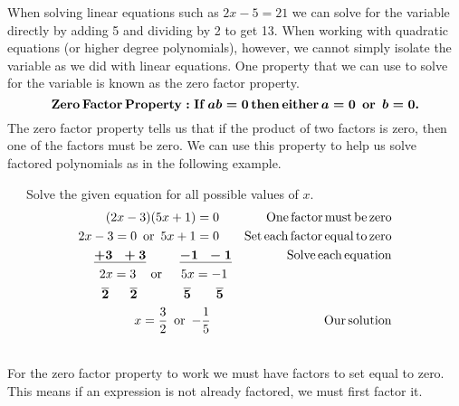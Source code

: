 {}\pp
When solving linear equations such as $2 x - 5 = 21$ we can solve for the
variable directly by adding 5 and dividing by 2 to get 13. When working with quadratic equations (or higher degree polynomials), however, we cannot simply isolate the variable as we did with linear equations.  One property that we can use to solve for the
variable is known as the zero factor property.
\[ \boldsymbol{\operatorname{Zero} \operatorname{Factor} \operatorname{Property} : \operatorname{If} a b = 0
   \operatorname{then} \operatorname{either} a = 0 \operatorname{~or~} b = 0.} \]
The zero factor property tells us that if the product of two factors is zero, then one of the factors must be zero.  We can use this property to help us solve factored polynomials as in the following example.

\begin{example}~~~Solve the given equation for all possible values of $x$.
  \begin{eqnarray*}
    (2 x - 3) (5 x + 1) = 0~~~ &  & \operatorname{One} \operatorname{factor} \operatorname{must}
    \operatorname{be} \operatorname{zero}\\
    2 x - 3 = 0 \operatorname{~or~} 5 x + 1 = 0~~~ &  & \operatorname{Set} \operatorname{each}
    \operatorname{factor} \operatorname{equal} \operatorname{to} \operatorname{zero}\\
    \boldsymbol{\underline{+ 3 ~~+ 3} ~~~~~~~~ \underline{- 1 ~~- 1}} &  & \operatorname{Solve} \operatorname{each}
    \operatorname{equation}\\
    2 x = 3 \operatorname{~~~or~~~~} 5 x = - 1~ &  & \\
    \boldsymbol{\overline{2} ~~~~~ \overline{2} ~~~~~~~~~~~ \overline{5} ~~~~~~ \overline{5}}~~ &  & \\
    x = \frac{3}{2} \operatorname{~or~} -\frac{1}{5}~~~~~ &  & \operatorname{Our} \operatorname{solution}
  \end{eqnarray*}
\end{example}
~\\
For the zero factor property to work we must have factors to set equal to zero.
This means if an expression is not already factored, we must first factor it.


